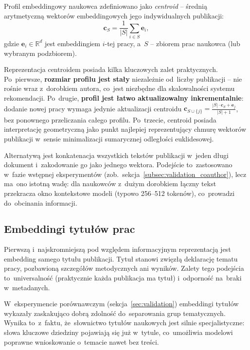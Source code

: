 Profil embeddingowy naukowca zdefiniowano jako \emph{centroid} --
średnią arytmetyczną wektorów embeddingowych jego indywidualnych
publikacji:
\begin{equation}
    \mathbf{c}_S = \frac{1}{|S|} \sum_{i \in S} \mathbf{e}_i,
    \label{eq:centroid_def}
\end{equation}
gdzie $\mathbf{e}_i \in \mathbb{R}^d$ jest embeddingiem $i$-tej pracy,
a~$S$ -- zbiorem prac naukowca (lub wybranym podzbiorem).

Reprezentacja centroidem posiada kilka kluczowych zalet praktycznych.
Po~pierwsze, \textbf{rozmiar profilu jest stały} niezależnie od~liczby
publikacji -- nie rośnie wraz z~dorobkiem autora, co~jest niezbędne
dla skalowalności systemu rekomendacji.
Po~drugie, \textbf{profil jest łatwo aktualizowalny inkrementalnie}:
dodanie nowej pracy wymaga jedynie aktualizacji centroidu
$\mathbf{c}_{S \cup \{j\}} = \frac{|S| \cdot \mathbf{c}_S + \mathbf{e}_j}{|S|+1}$,
bez ponownego przeliczania całego profilu.
Po~trzecie, centroid posiada interpretację geometryczną jako punkt
najlepiej reprezentujący chmurę wektorów publikacji w~sensie
minimalizacji sumarycznej odległości euklidesowej.

Alternatywą jest konkatenacja wszystkich tekstów publikacji
w~jeden długi dokument i~zakodowanie go jako jednego wektora.
Podejście to~zastosowano w~fazie wstępnej eksperymentów
(zob.\ sekcja~\ref{subsec:validation_coauthor}),
lecz ma~ono istotną wadę: dla naukowców z~dużym dorobkiem
łączny tekst przekracza okno kontekstowe modeli
(typowo 256--512 tokenów), co~prowadzi do~obcinania informacji.

\subsection{Embeddingi tytułów prac}
\label{subsec:titles}

Pierwszą i~najskromniejszą pod względem informacyjnym reprezentacją
jest embedding samego tytułu publikacji.
Tytuł stanowi zwięzłą deklarację tematu pracy, pozbawioną
szczegółów metodycznych ani wyników.
Zalety tego podejścia to~universalność (praktycznie każda publikacja
ma tytuł) i~odporność na~braki w~metadanych.

W~eksperymencie porównawczym (sekcja~\ref{sec:validation})
embeddingi tytułów wykazały zaskakująco dobrą zdolność
do~separowania grup tematycznych.
Wynika to~z~faktu, że~słownictwo tytułów naukowych jest
silnie specjalistyczne: słowa kluczowe dziedziny pojawiają się
już w~tytule, co~umożliwia modelowi poprawne wnioskowanie
o~temacie nawet bez treści.

